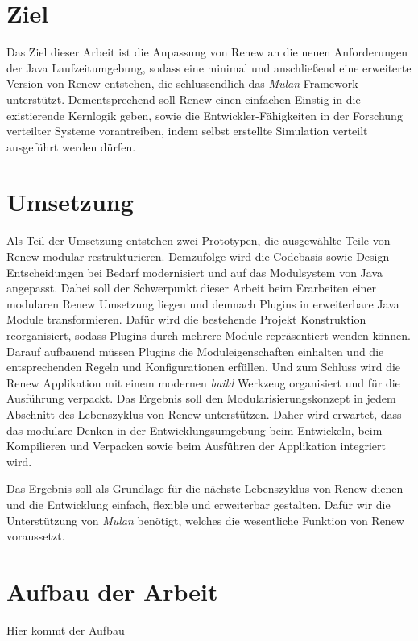 \section{Ziel} \label{sec:Z}

Das Ziel dieser Arbeit ist die Anpassung von Renew an die neuen Anforderungen der Java Laufzeitumgebung, sodass eine minimal und anschließend eine  erweiterte Version von Renew entstehen, die schlussendlich das \textit{Mulan} Framework unterstützt. Dementsprechend soll Renew einen einfachen Einstig in die existierende Kernlogik geben, sowie die Entwickler-Fähigkeiten in der Forschung verteilter Systeme vorantreiben, indem selbst erstellte Simulation verteilt ausgeführt werden dürfen.

\section{Umsetzung} \label{sec:U}

Als Teil der Umsetzung entstehen zwei Prototypen, die ausgewählte Teile von Renew modular restrukturieren. Demzufolge wird die Codebasis sowie Design Entscheidungen bei Bedarf modernisiert und auf das Modulsystem von Java angepasst. Dabei soll der Schwerpunkt dieser Arbeit beim Erarbeiten einer modularen Renew Umsetzung liegen und demnach Plugins in erweiterbare Java Module transformieren.\newline
Dafür wird die bestehende Projekt Konstruktion reorganisiert, sodass Plugins durch mehrere Module repräsentiert wenden können. Darauf aufbauend müssen Plugins die Moduleigenschaften einhalten und die entsprechenden Regeln und Konfigurationen erfüllen. Und zum Schluss wird die Renew Applikation mit einem modernen \textit{build} Werkzeug organisiert und für die Ausführung verpackt.\newline
Das Ergebnis soll den Modularisierungskonzept in jedem Abschnitt des Lebenszyklus von Renew unterstützen. Daher wird erwartet, dass das modulare Denken in der Entwicklungsumgebung beim Entwickeln, beim Kompilieren und Verpacken sowie beim Ausführen der Applikation integriert wird. \bigbreak

Das Ergebnis soll als Grundlage für die nächste Lebenszyklus von Renew dienen und die Entwicklung einfach, flexible und erweiterbar gestalten. Dafür wir die Unterstützung von \textit{Mulan} benötigt, welches die wesentliche Funktion von Renew voraussetzt. 

\section{Aufbau der Arbeit} \label{sec:AdA}
Hier kommt der Aufbau 

